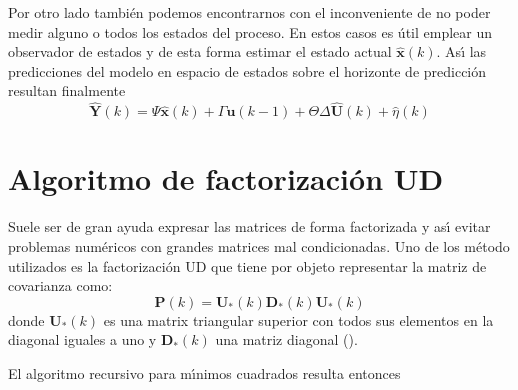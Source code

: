 Por otro lado tambi{\'e}n podemos encontrarnos con el inconveniente de no poder medir alguno o todos los estados
del proceso. En estos casos es {\'u}til emplear un observador de estados y de esta forma estimar el estado
actual $\mathbf{\hat{x}}(k)$. As{\'\i} las predicciones del modelo en espacio de estados sobre el horizonte de
predicci{\'o}n resultan finalmente
\begin{equation}
 \mathbf{\hat{Y}}(k)=\Psi \mathbf{\hat{x}}(k)+\Gamma \mathbf{u}(k-1)+\Theta \Delta\mathbf{\hat{U}}(k)
                     +\hat{\eta}(k)
\end{equation}

\section{Algoritmo de factorizaci{\'o}n UD}\label{A_4}
Suele ser de gran ayuda expresar las matrices de forma factorizada y as{\'\i} evitar problemas num{\'e}ricos con
grandes matrices mal condicionadas. Uno de los m{\'e}todo utilizados es la factorizaci{\'o}n UD que tiene por objeto
representar la matriz de covarianza como:
\begin{equation}
 \mathbf{P}(k)=\mathbf{U}_*(k)\mathbf{D}_*(k)\mathbf{U}_*(k)
\end{equation}
donde $\mathbf{U}_*(k)$ es una matrix triangular superior con todos sus elementos en la diagonal iguales a
uno y $\mathbf{D}_*(k)$ una matriz diagonal (\cite{Ll:99,ZyLx:99,JmBmZd:06,Jm:90}).

El algoritmo recursivo para m{\'\i}nimos cuadrados resulta entonces

